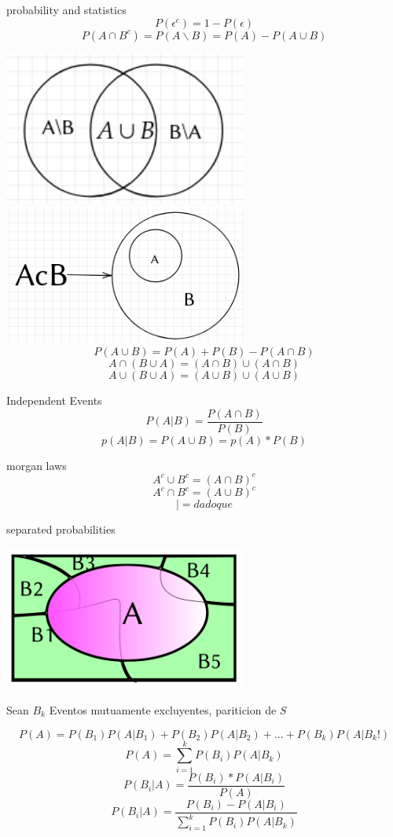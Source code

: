 \begin{section}{probability and statistics}
	$$P(\epsilon^{c})=1-P(\epsilon)$$	
	$$P(A \cap B^{c}) =P(A \backslash B) =  P(A) - P(A \cup B)$$

	\includegraphics[width=8cm]{1.png}
	\includegraphics[width=8cm]{2.png}
	$$P(A \cup B) =P(A) + P(B) - P(A \cap B) $$
	$$ A \cap (B \cup A ) = (A \cap B) \cup (A \cap B) $$
	$$ A \cup (B \cup A ) = (A \cup B) \cup (A \cup B) $$


	\begin{subsection}{Independent Events}
	$$ P(A|B) = \frac{P(A \cap B )} { P(B) }$$
	$$ p(A|B) =  P(A \cup B) = p(A)*P(B) $$
	\end{subsection}

	\begin{subsection}{morgan laws}
	$$ A^{c} \cup B^{c} = (A \cap B)^{c} $$
	$$ A^{c} \cap B^{c} = (A \cup B)^{c} $$
	$$ | = dado que $$
	\newpage
	\end{subsection}
	\begin{subsection}{separated probabilities}
	\begin{center}

	\includegraphics[width=8cm]{3.png}

	Sean $B_k$ Eventos mutuamente excluyentes, pariticion de $S$

	\end{center}
	$$P(A) = P(B_1)P(A|B_1) + P(B_2)P(A|B_2) + ... + P(B_k)P(A|B_k!)$$
	$$P(A) = \sum_{i=1}^{k}P(B_i)P(A|B_k)$$
	$$P(B_i|A) = \frac{ P(B_i)*P(A|B_i) }{ P(A) } $$
	$$P(B_i|A) = \frac{P(B_i) - P(A|B_i)}{\sum\limits_{i=1}^{k}P(B_i)P(A|B_k)}$$
	\end{subsection}




\end{section}

